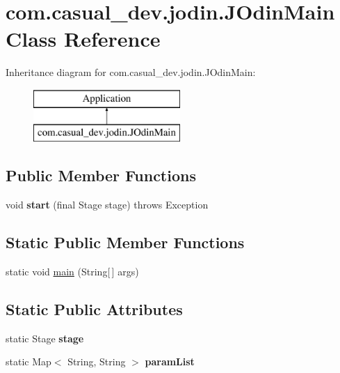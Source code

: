 \hypertarget{classcom_1_1casual__dev_1_1jodin_1_1_j_odin_main}{\section{com.\-casual\-\_\-dev.\-jodin.\-J\-Odin\-Main Class Reference}
\label{classcom_1_1casual__dev_1_1jodin_1_1_j_odin_main}
}
Inheritance diagram for com.\-casual\-\_\-dev.\-jodin.\-J\-Odin\-Main\-:\begin{figure}[H]
\begin{center}
\leavevmode
\includegraphics[height=2.000000cm]{classcom_1_1casual__dev_1_1jodin_1_1_j_odin_main}
\end{center}
\end{figure}
\subsection*{Public Member Functions}
\begin{DoxyCompactItemize}
\item 
\hypertarget{classcom_1_1casual__dev_1_1jodin_1_1_j_odin_main_a3444f79dc924d5e50e8e4f289a3c8e92}{void {\bfseries start} (final Stage stage)  throws Exception }\label{classcom_1_1casual__dev_1_1jodin_1_1_j_odin_main_a3444f79dc924d5e50e8e4f289a3c8e92}

\end{DoxyCompactItemize}
\subsection*{Static Public Member Functions}
\begin{DoxyCompactItemize}
\item 
static void \hyperlink{classcom_1_1casual__dev_1_1jodin_1_1_j_odin_main_a6c44473333866f15268e176396d8c2b2}{main} (String\mbox{[}$\,$\mbox{]} args)
\end{DoxyCompactItemize}
\subsection*{Static Public Attributes}
\begin{DoxyCompactItemize}
\item 
\hypertarget{classcom_1_1casual__dev_1_1jodin_1_1_j_odin_main_a84e50cd9e02d08a9a67f748a51f55bf5}{static Stage {\bfseries stage}}\label{classcom_1_1casual__dev_1_1jodin_1_1_j_odin_main_a84e50cd9e02d08a9a67f748a51f55bf5}

\item 
\hypertarget{classcom_1_1casual__dev_1_1jodin_1_1_j_odin_main_aec478929f923db41db46276b843c810b}{static Map$<$ String, String $>$ {\bfseries param\-List}}\label{classcom_1_1casual__dev_1_1jodin_1_1_j_odin_main_aec478929f923db41db46276b843c810b}

\end{DoxyCompactItemize}


